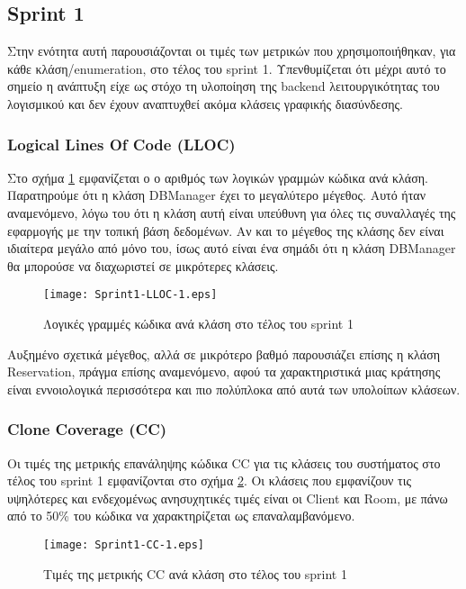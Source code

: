 \subsection{Sprint 1}

Στην ενότητα αυτή παρουσιάζονται οι τιμές των μετρικών που
χρησιμοποιήθηκαν, για κάθε κλάση/enumeration, στο τέλος του sprint 1. Υπενθυμίζεται
ότι μέχρι αυτό το σημείο η ανάπτυξη είχε ως στόχο τη υλοποίηση της
backend λειτουργικότητας του λογισμικού και δεν έχουν αναπτυχθεί ακόμα
κλάσεις γραφικής διασύνδεσης.

\subsubsection{Logical Lines Of Code (LLOC)}
\label{section:sprint1LLOC}

Στο σχήμα \ref{fig:sprint1LLOC} εμφανίζεται ο ο αριθμός των λογικών
γραμμών κώδικα ανά κλάση. Παρατηρούμε ότι η κλάση DBManager
έχει το μεγαλύτερο μέγεθος. Αυτό ήταν αναμενόμενο, λόγω του ότι η κλάση
αυτή είναι υπεύθυνη για όλες τις συναλλαγές της εφαρμογής με την τοπική βάση
δεδομένων. Αν και το μέγεθος της κλάσης δεν είναι ιδιαίτερα μεγάλο από
μόνο του, ίσως αυτό είναι ένα σημάδι ότι η κλάση DBManager θα μπορούσε να
διαχωριστεί σε μικρότερες κλάσεις.

\begin{figure}
\centering
\texttt{[image: Sprint1-LLOC-1.eps]}
\caption{Λογικές γραμμές κώδικα ανά κλάση στο τέλος του sprint 1}
\label{fig:sprint1LLOC}
\end{figure}

Αυξημένο σχετικά μέγεθος, αλλά σε μικρότερο βαθμό παρουσιάζει επίσης η
κλάση Reservation, πράγμα επίσης αναμενόμενο, αφού τα χαρακτηριστικά
μιας κράτησης είναι εννοιολογικά περισσότερα και πιο πολύπλοκα από αυτά
των υπολοίπων κλάσεων.

\subsubsection{Clone Coverage (CC)}
\label{section:sprint1CC}

Οι τιμές της μετρικής επανάληψης κώδικα CC για τις κλάσεις του
συστήματος στο τέλος του sprint 1 εμφανίζονται στο σχήμα
\ref{fig:sprint1CC}. Οι κλάσεις που εμφανίζουν τις υψηλότερες και
ενδεχομένως ανησυχητικές τιμές είναι οι Client και Room, με πάνω από το
50\% του κώδικα να χαρακτηρίζεται ως επαναλαμβανόμενο.

\begin{figure}
\centering
\texttt{[image: Sprint1-CC-1.eps]}
\caption{Τιμές της μετρικής CC ανά κλάση στο τέλος του sprint 1}
\label{fig:sprint1CC}
\end{figure}

